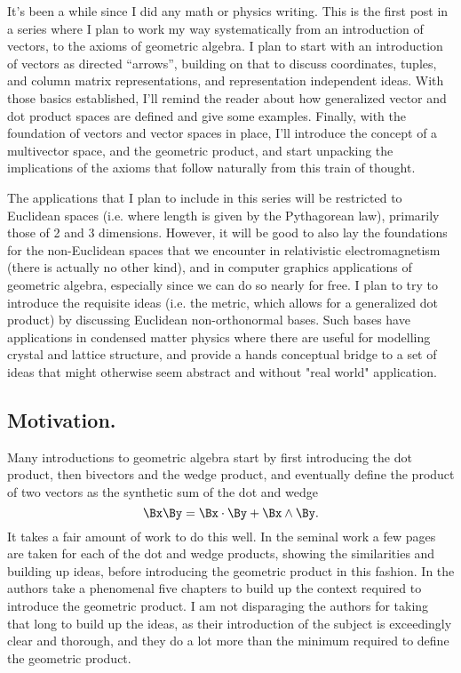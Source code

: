 It's been a while since I did any math or physics writing.
This is the first post in a series where I plan to work my way systematically from an introduction of vectors, to the axioms of geometric algebra.
I plan to start with an introduction of vectors as directed ``arrows'', building on that to discuss coordinates, tuples, and column matrix representations, and representation independent ideas.
With those basics established, I'll remind the reader about how generalized vector and dot product spaces are defined and give some examples.
Finally, with the foundation of vectors and vector spaces in place, I'll introduce the concept of a multivector space, and the geometric product, and start unpacking the implications of the axioms that follow naturally from this train of thought.

The applications that I plan to include in this series will be restricted to Euclidean spaces (i.e. where length is given by the Pythagorean law), primarily those of 2 and 3 dimensions.
However, it will be good to also lay the foundations for the non-Euclidean spaces that we encounter in relativistic electromagnetism (there is actually no other kind), and in computer graphics applications of geometric algebra, especially since we can do so nearly for free.
I plan to try to introduce the requisite ideas (i.e. the metric, which allows for a generalized dot product) by discussing Euclidean non-orthonormal bases.
Such bases have applications in condensed matter physics where there are useful for modelling crystal and lattice structure, and provide a hands conceptual bridge to a set of ideas that might otherwise seem abstract and without "real world" application.

\subsection{Motivation.}
Many introductions to geometric algebra start by first introducing the dot product, then bivectors and the wedge product, and eventually define the product of two vectors as the synthetic sum of the dot and wedge
\begin{equation}\label{eqn:inthepipe:20}
\Bx \By = \Bx \cdot \By + \Bx \wedge \By.
\end{equation}
It takes a fair amount of work to do this well.
In the seminal work \citep{hestenes1999nfc} a few pages are taken for each of the dot and wedge products, showing the similarities and building up ideas, before introducing the geometric product in this fashion.
In \citep{dorst2007gac} the authors take a phenomenal five chapters to build up the context required to introduce the geometric product.
I am not disparaging the authors for taking that long to build up the ideas, as their introduction of the subject is exceedingly clear and thorough, and they do a lot more than the minimum required to define the geometric product.

